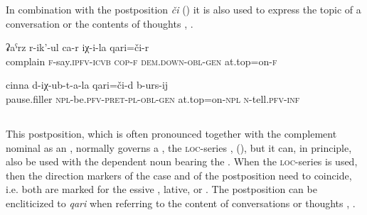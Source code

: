 In combination with the postposition \textit{či} () it is also used to express the topic of a conversation or the contents of thoughts , .
% 
\begin{exe}
	\ex
	\begin{xlist}
		\ex	\label{She is complaining about him}
		\gll	ʡaˁrz	r-ik'-ul ca-r	iχ-i-la	qari=či-r  \\
			complain	\textsc{f}-say.\textsc{ipfv}-\textsc{icvb} \textsc{cop-f}	\textsc{dem.down}-\textsc{obl}-\textsc{gen}	at.top=on-\textsc{f}\\
		\glt	{}

		\ex	\label{to talk about what had happened}
		\gll	cinna	d-iχ-ub-t-a-la	qari=či-d	b-urs-ij  \\
			pause.filler	\textsc{npl}-be.\textsc{pfv}-\textsc{pret}-\textsc{pl}-\textsc{obl}-\textsc{gen}	at.top=on-\textsc{npl}	\textsc{n}-tell.\textsc{pfv}-\textsc{inf}\\
		\glt	{}
	\end{xlist}
\end{exe}



\subsection{ }
\label{ssec:postposition ci}

This postposition, which is often pronounced together with the complement nominal as an , normally governs a , the \textsc{loc}-series ,  (), but it can, in principle, also be used with the dependent noun bearing the  . When the \textsc{loc}-series is used, then the direction markers of the case and of the postposition need to coincide, i.e. both are marked for the essive , lative, or  . The postposition can be encliticized to \textit{qari} when referring to the content of conversations or thoughts , . 

